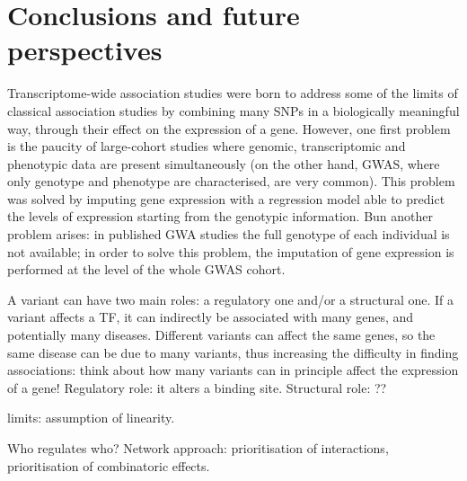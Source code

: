 \documentclass[../main.tex]{subfiles}
\begin{document}
\chapter{Conclusions and future perspectives}

Transcriptome-wide association studies were born to address some of the 
limits of classical association studies by combining many SNPs in a 
biologically meaningful way, \ie through their effect on the expression 
of a gene. However, one first problem is the paucity of large-cohort 
studies where genomic, transcriptomic and phenotypic data are present 
simultaneously (on the other hand, GWAS, where only genotype and 
phenotype are characterised, are very common). This problem was solved 
by imputing gene expression with a regression model able to predict the 
levels of expression starting from the genotypic information. Bun 
another problem arises: in published GWA studies the full genotype of 
each individual is not available; in order to solve this problem, the 
imputation of gene expression is performed at the level of the whole 
GWAS cohort.

A variant can have two main roles: a regulatory one and/or a structural 
one. If a variant affects a TF, it can indirectly be associated with 
many genes, and potentially many diseases. Different variants can affect 
the same genes, so the same disease can be due to many variants, thus 
increasing the difficulty in finding associations: think about how many 
variants can in principle affect the expression of a gene! Regulatory 
role: it alters a binding site. Structural role: ??

limits: assumption of linearity.

Who regulates who? Network approach: prioritisation of interactions, 
prioritisation of combinatoric effects.

\end{document}
